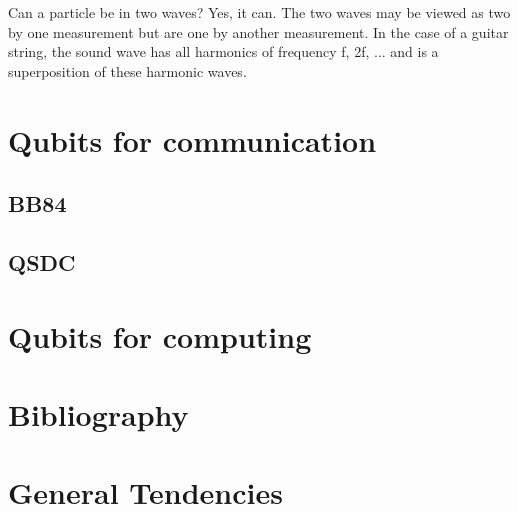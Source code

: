 \documentclass{book}
\begin{document}
Can a particle be in two waves? Yes, it can. The two waves may be viewed as two by one measurement but are one by another measurement. In the case of a guitar string, the sound wave has all harmonics of frequency f, 2f, ... and is a superposition of these harmonic waves.

\chapter{Qubits for communication}
\section{BB84}
\section{QSDC}
\chapter{Qubits for computing}
\chapter{Bibliography}
\chapter{General Tendencies}

\backmatter
{}
\printindex
\end{document}
